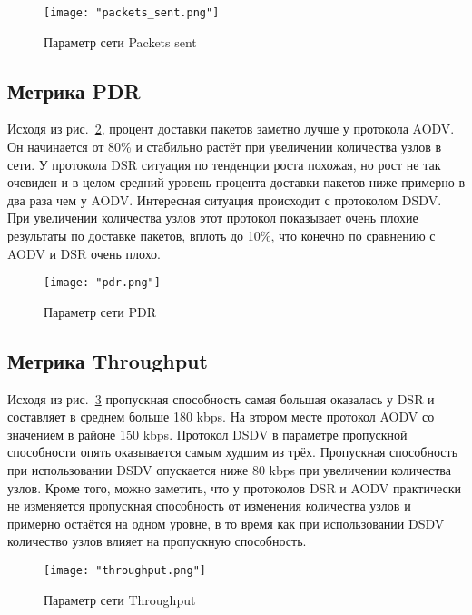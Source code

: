 \begin{figure}[!h]
    \centering
    \texttt{[image: "packets\_sent.png"]}
    \caption{Параметр сети Packets sent}
    \label{fig:packets_sent_plot}
\end{figure}

\subsection*{Метрика PDR}

Исходя из рис.~\ref{fig:pdr_plot}, процент доставки пакетов заметно лучше у протокола AODV. Он начинается от 80\% и стабильно растёт при увеличении количества узлов в сети. У протокола DSR ситуация по тенденции роста похожая, но рост не так очевиден и в целом средний уровень процента доставки пакетов ниже примерно в два раза чем у AODV. Интересная ситуация происходит с протоколом DSDV. При увеличении количества узлов этот протокол показывает очень плохие результаты по доставке пакетов, вплоть до  10\%, что конечно по сравнению с AODV и DSR очень плохо. 
  
\begin{figure}[!h]
    \centering
    \texttt{[image: "pdr.png"]}
    \caption{Параметр сети PDR}
    \label{fig:pdr_plot}
\end{figure}

\subsection*{Метрика Throughput}

Исходя из рис.~\ref{fig:throughput_plot} пропускная способность самая большая оказалась у DSR и составляет в среднем больше 180 kbps. На втором месте протокол AODV со значением в районе 150 kbps. Протокол DSDV в параметре пропускной способности опять оказывается самым худшим из трёх. Пропускная способность при использовании DSDV опускается ниже 80 kbps при увеличении количества узлов. Кроме того, можно заметить, что у протоколов DSR и AODV практически не изменяется пропускная способность от изменения количества узлов и примерно остаётся на одном уровне, в то время как при использовании DSDV количество узлов влияет на пропускную способность. 

\begin{figure}[!h]
    \centering
    \texttt{[image: "throughput.png"]}
    \caption{Параметр сети Throughput}
    \label{fig:throughput_plot}
\end{figure}

